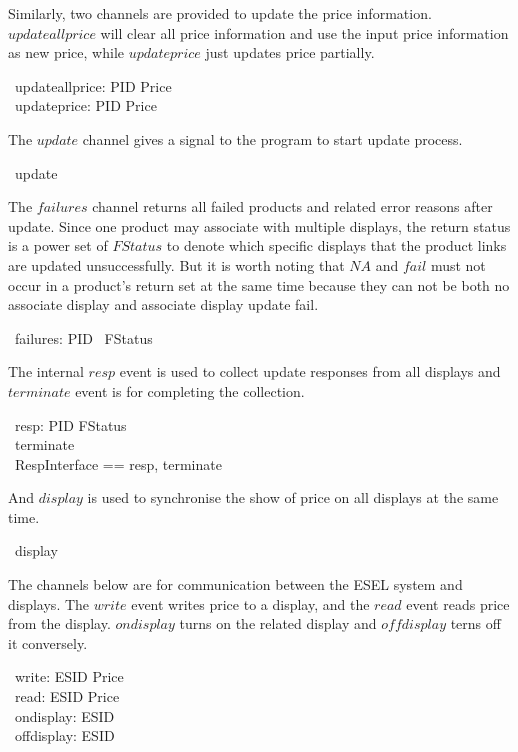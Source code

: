 Similarly, two channels are provided to update the price information. $updateallprice$ will clear all price information and use the input price information as new price, while $updateprice$ just updates price partially.  
\begin{circus}
	\circchannel\ updateallprice: PID \pfun Price \\
	\circchannel\ updateprice: PID \pfun Price
\end{circus}

The $update$ channel gives a signal to the program to start update process.
\begin{circus}
	\circchannel\ update
\end{circus}

The $failures$ channel returns all failed products and related error reasons after update. Since one product may associate with multiple displays, the return status is a power set of $FStatus$ to denote which specific displays that the product links are updated unsuccessfully. But it is worth noting that $NA$ and $fail$ must not occur in a product's return set at the same time because they can not be both no associate display and associate display update fail.
\begin{circus}
	\circchannel\ failures: PID \pfun \power~FStatus \\
\end{circus}

The internal $resp$ event is used to collect update responses from all displays and $terminate$ event is for completing the collection.
\begin{circus}
	\circchannel\ resp: PID \cross FStatus \\
    \circchannel\ terminate \\
    \circchannelset\ RespInterface == \lchanset resp, terminate \rchanset 
\end{circus}

And $display$ is used to synchronise the show of price on all displays at the same time.
\begin{circus}
	\circchannel\ display
\end{circus}

The channels below are for communication between the ESEL system and displays. The $write$ event writes price to a display, and the $read$ event reads price from the display. $ondisplay$ turns on the related display and $offdisplay$ terns off it conversely.
\begin{circus}
	\circchannel\ write: ESID \cross Price \\
	\circchannel\ read: ESID \cross Price \\
	\circchannel\ ondisplay: ESID \\
	\circchannel\ offdisplay: ESID 
\end{circus}

